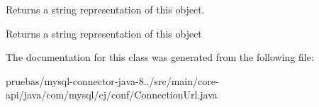 Returns a string representation of this object.

\begin{DoxyReturn}{Returns}
a string representation of this object 
\end{DoxyReturn}


The documentation for this class was generated from the following file\+:\begin{DoxyCompactItemize}
\item 
pruebas/mysql-\/connector-\/java-\/8../src/main/core-\/api/java/com/mysql/cj/conf/Connection\+Url.\+java\end{DoxyCompactItemize}
